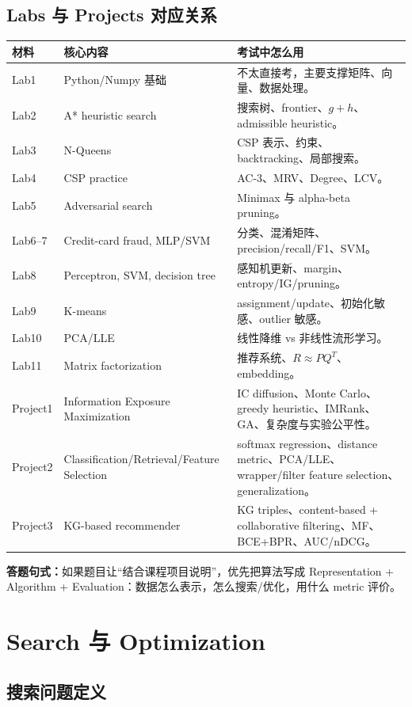 \documentclass[UTF8,11pt,a4paper]{ctexart}
\newcommand{\ans}[1]{\textbf{答题句式：}#1}
\begin{document}
\subsection{Labs 与 Projects 对应关系}

\begin{longtable}{p{}p{}p{}}
\toprule
材料 & 核心内容 & 考试中怎么用 \\
\midrule
Lab1 & Python/Numpy 基础 & 不太直接考，主要支撑矩阵、向量、数据处理。\\
Lab2 & A* heuristic search & 搜索树、frontier、$g+h$、admissible heuristic。\\
Lab3 & N-Queens & CSP 表示、约束、backtracking、局部搜索。\\
Lab4 & CSP practice & AC-3、MRV、Degree、LCV。\\
Lab5 & Adversarial search & Minimax 与 alpha-beta pruning。\\
Lab6--7 & Credit-card fraud, MLP/SVM & 分类、混淆矩阵、precision/recall/F1、SVM。\\
Lab8 & Perceptron, SVM, decision tree & 感知机更新、margin、entropy/IG/pruning。\\
Lab9 & K-means & assignment/update、初始化敏感、outlier 敏感。\\
Lab10 & PCA/LLE & 线性降维 vs 非线性流形学习。\\
Lab11 & Matrix factorization & 推荐系统、$R\approx PQ^T$、embedding。\\
Project1 & Information Exposure Maximization & IC diffusion、Monte Carlo、greedy heuristic、IMRank、GA、复杂度与实验公平性。\\
Project2 & Classification/Retrieval/Feature Selection & softmax regression、distance metric、PCA/LLE、wrapper/filter feature selection、generalization。\\
Project3 & KG-based recommender & KG triples、content-based + collaborative filtering、MF、BCE+BPR、AUC/nDCG。\\
\bottomrule
\end{longtable}

\ans{如果题目让“结合课程项目说明”，优先把算法写成 Representation + Algorithm + Evaluation：数据怎么表示，怎么搜索/优化，用什么 metric 评价。}

\section{Search 与 Optimization}

\subsection{搜索问题定义}
\end{document}
